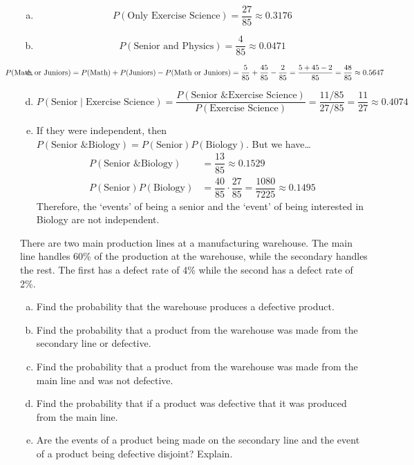 \documentclass[11pt,letterpaper]{article}
\begin{document}
\sol 
\begin{enumerate}[(a)]
\item 
	\[
	P(\text{Only Exercise Science})= \dfrac{27}{85} \approx 0.3176
	\]

\item 
	\[
	P(\text{Senior and Physics})= \dfrac{4}{85} \approx 0.0471
	\]

\item 
	\[
	\hspace{-1.5cm} P(\text{Math or Juniors})= P(\text{Math}) + P(\text{Juniors}) - P(\text{Math or Juniors})= \dfrac{5}{85} + \dfrac{45}{85} - \dfrac{2}{85}= \dfrac{5 + 45 - 2}{85}= \dfrac{48}{85} \approx 0.5647
	\]

\item 
	\[
	P(\text{Senior} \;|\; \text{Exercise Science})= \dfrac{P(\text{Senior \& Exercise Science})}{P(\text{Exercise Science})}= \dfrac{11/85}{27/85}= \dfrac{11}{27} \approx 0.4074
	\]

\item If they were independent, then $P(\text{Senior \& Biology})= P(\text{Senior}) P(\text{Biology})$. But we have\dots
	\[
	\begin{aligned}
	P(\text{Senior \& Biology})&= \dfrac{13}{85} \approx 0.1529 \\
	P(\text{Senior}) P(\text{Biology})&= \dfrac{40}{85} \cdot \dfrac{27}{85}= \dfrac{1080}{7225} \approx 0.1495
	\end{aligned}
	\]
Therefore, the `events' of being a senior and the `event' of being interested in Biology are not independent. 
\end{enumerate}



\newpage



 There are two main production lines at a manufacturing warehouse. The main line handles 60\% of the production at the warehouse, while the secondary handles the rest. The first has a defect rate of 4\% while the second has a defect rate of 2\%. 
	\begin{enumerate}[(a)]
	\item Find the probability that the warehouse produces a defective product. 
	\item Find the probability that a product from the warehouse was made from the secondary line or defective. 
	\item Find the probability that a product from the warehouse was made from the main line and was not defective. 
	\item Find the probability that if a product was defective that it was produced from the main line. 
	\item Are the events of a product being made on the secondary line and the event of a product being defective disjoint? Explain. 
	\end{enumerate} \pspace
\end{document}
